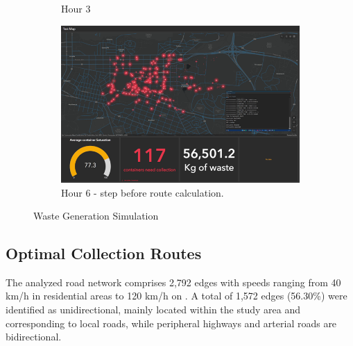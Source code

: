 \documentclass[authoryear,preprint,review,11pt,doubleblind]{elsarticle}
\begin{document}
\begin{figure}[h!]
\begin{subfigure}[b]{0.45\linewidth}
        \caption{Hour 3}
    \end{subfigure}
    \begin{subfigure}[b]{0.45\linewidth}
        \includegraphics[width=\linewidth]{Figures/Sim6.png}
        \caption{Hour 6 - step before route calculation.}
    \end{subfigure}
    \caption{Waste Generation Simulation}
        \label{fig:Sim1}
    \end{figure}

    \subsection{Optimal Collection Routes}\label{subs:Optimalroute}
    
    The analyzed road network comprises 2,792 edges with speeds ranging from 40 km/h in residential areas to 120 km/h on . %
   A total of 1,572 edges (56.30\%) were identified as unidirectional, mainly located within the study area and corresponding to local roads, while peripheral highways and arterial roads are bidirectional.%

\end{document}
